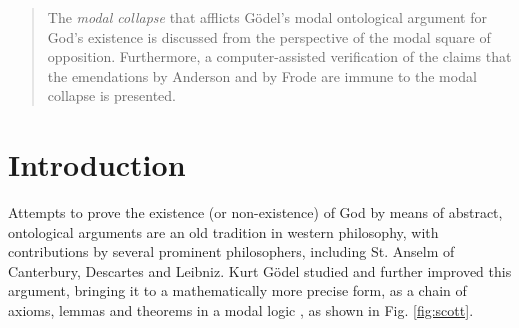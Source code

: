 \documentclass{birkjour}
\theoremstyle{definition}
\theoremstyle{remark}
\numberwithin{equation}{section}
\begin{document}
\date{August 30, 2014}
\dedicatory{ }

\begin{abstract}
The \emph{modal collapse} that afflicts G\"odel's modal ontological 
argument for God's existence is discussed from the perspective of the 
modal square of opposition. Furthermore, a computer-assisted verification 
of the claims that the emendations by Anderson and by Frode are immune to 
the modal collapse is presented.
\end{abstract}

\maketitle
\section{Introduction}

Attempts to prove the
existence (or non-existence) of God by means of abstract, ontological
arguments are an old tradition in western philosophy, with contributions by several prominent philosophers, including St. Anselm of
Canterbury, Descartes and Leibniz. Kurt G{\"o}del studied and further improved this argument, bringing it to a mathematically more precise form, as a chain of axioms, lemmas and theorems in a modal logic \cite{GoedelNotes,ScottNotes}, as shown in Fig. \ref{fig:scott}.
\end{document}
